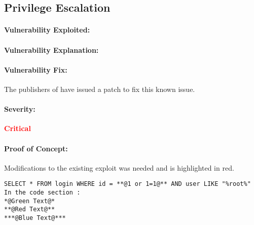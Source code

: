 \ifdefined\gotroot

\subsection{Privilege Escalation}

\paragraph{Vulnerability Exploited:}
\vulnx

\paragraph{Vulnerability Explanation:}


\paragraph{Vulnerability Fix:}
The publishers of \product{} have issued a patch to fix this known issue.

\paragraph{Severity:}
\textbf{\textcolor{red}{Critical}}

\paragraph{Proof of Concept:} 
Modifications to the existing exploit was needed and is highlighted in red.
\begin{lstlisting}[caption={Exploitation of \hostname}]
SELECT * FROM login WHERE id = **@1 or 1=1@** AND user LIKE "%root%"
In the code section :
*@Green Text@*
**@Red Text@**
***@Blue Text@***
\end{lstlisting}


